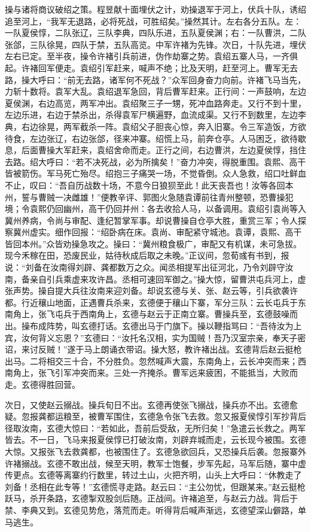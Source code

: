 操与诸将商议破绍之策。程昱献十面埋伏之计，劝操退军于河上，伏兵十队，诱绍追至河上，“我军无退路，必将死战，可胜绍矣。”操然其计。左右各分五队。左：一队夏侯惇，二队张辽，三队李典，四队乐进，五队夏侯渊；右：一队曹洪，二队张郃，三队徐晃，四队于禁，五队高览。中军许褚为先锋。次日，十队先进，埋伏左右已定。至半夜，操令许褚引兵前进，伪作劫寨之势。袁绍五寨人马，一齐俱起。许褚回军便走。袁绍引军赶来，喊声不绝；比及天明，赶至河上。曹军无去路，操大呼曰：“前无去路，诸军何不死战？”众军回身奋力向前。许褚飞马当先，力斩十数将。袁军大乱。袁绍退军急回，背后曹军赶来。正行间：一声鼓响，左边夏侯渊，右边高览，两军冲出。袁绍聚三子一甥，死冲血路奔走。又行不到十里，左边乐进，右边于禁杀出，杀得袁军尸横遍野，血流成渠。又行不到数里，左边李典，右边徐晃，两军截杀一阵。袁绍父子胆丧心惊，奔入旧寨。令三军造饭，方欲待食，左边张辽，右边张郃，径来冲寨。绍慌上马，前奔仓亭。人马困乏，欲待歇息，后面曹操大军赶来，袁绍舍命而走。正行之间，右边曹洪，左边夏侯惇，挡住去路。绍大呼曰：“若不决死战，必为所擒矣！”奋力冲突，得脱重围。袁熙、高干皆被箭伤。军马死亡殆尽。绍抱三子痛哭一场，不觉昏倒。众人急救，绍口吐鲜血不止，叹曰：“吾自历战数十场，不意今日狼狈至此！此天丧吾也！汝等各回本州，誓与曹贼一决雌雄！”便教辛评、郭图火急随袁谭前往青州整顿，恐曹操犯境；令袁熙仍回幽州，高干仍回并州：各去收拾人马，以备调用。袁绍引袁尚等入冀州养病，令尚与审配、逢纪暂掌军事。却说曹操自仓亭大胜，重赏三军；令人探察冀州虚实。细作回报：“绍卧病在床。袁尚、审配紧守城池。袁谭，袁熙、高干皆回本州。”众皆劝操急攻之。操曰：“冀州粮食极广，审配又有机谋，未可急拔。现今禾稼在田，恐废民业，姑待秋成后取之未晚。”正议间，忽荀彧有书到，报说：“刘备在汝南得刘辟、龚都数万之众。闻丞相提军出征河北，乃令刘辟守汝南，备亲自引兵乘虚来攻许昌。丞相可速回军御之。”操大惊，留曹洪屯兵河上，虚张声势。操自提大兵往汝南来迎刘备。却说玄德与关、张、赵云等，引兵欲袭许都。行近穰山地面，正遇曹兵杀来，玄德便于穰山下寨，军分三队：云长屯兵于东南角上，张飞屯兵于西南角上，玄德与赵云于正南立寨。曹操兵至，玄德鼓噪而出。操布成阵势，叫玄德打话。玄德出马于门旗下。操以鞭指骂曰：“吾待汝为上宾，汝何背义忘恩？”玄德曰：“汝托名汉相，实为国贼！吾乃汉室宗亲，奉天子密诏，来讨反贼！”遂于马上朗诵衣带诏。操大怒，教许褚出战。玄德背后赵云挺枪出马。二将相交三十合，不分胜负。忽然喊声大震，东南角上，云长冲突而来；西南角上，张飞引军冲突而来。三处一齐掩杀。曹军远来疲困，不能抵当，大败而走。玄德得胜回营。

次日，又使赵云搦战。操兵旬日不出。玄德再使张飞搦战，操兵亦不出。玄德愈疑。忽报龚都运粮至，被曹军围住，玄德急令张飞去救。忽又报夏侯惇引军抄背后径取汝南，玄德大惊曰：“若如此，吾前后受敌，无所归矣！”急遣云长救之。两军皆去。不一日，飞马来报夏侯惇已打破汝南，刘辟弃城而走，云长现今被围。玄德大惊。又报张飞去救龚都，也被围住了。玄德急欲回兵，又恐操兵后袭。忽报寨外许褚搦战。玄德不敢出战，候至天明，教军士饱餐，步军先起，马军后随，寨中虚传更点。玄德等离寨约行数里，转过土山，火把齐明，山头上大呼曰：“休教走了刘备！丞相在此专等！”玄德慌寻走路。赵云曰：“主公勿忧，但跟某来。”赵云挺枪跃马，杀开条路，玄德掣双股剑后随。正战间。许褚追至，与赵云力战。背后于禁、李典又到。玄德见势危，落荒而走。听得背后喊声渐远，玄德望深山僻路，单马逃生。

